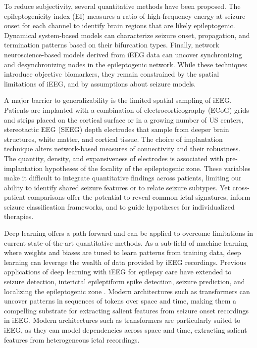 \documentclass[11pt]{article}
\begin{document}
To reduce subjectivity, several quantitative methods have been proposed. The epileptogenicity index (EI)\cite{Bartolomei2008Epileptogenicity, Grinenko2018fingerprint} measures a ratio of high-frequency energy at seizure onset for each channel to identify brain regions that are likely epileptogenic. Dynamical system-based models can characterize seizure onset, propagation, and termination patterns based on their bifurcation types\cite{Saggio2020taxonomy}. Finally, network neuroscience-based models derived from iEEG data can uncover synchronizing and desynchronizing nodes in the epileptogenic network\cite{Khambhati2016Virtual, Kini2019Virtual}. While these techniques introduce objective biomarkers, they remain constrained by the spatial limitations of iEEG, and by assumptions about seizure models.

A major barrier to generalizability is the limited spatial sampling of iEEG. Patients are implanted with a combination of electrocorticography (ECoG) grids and strips placed on the cortical surface or in a growing number of US centers, stereotactic EEG (SEEG) depth electrodes that sample from deeper brain structures, white matter, and cortical tissue. The choice of implantation technique alters network-based measures of connectivity and their robustness\cite{Bernabei2021Electrocorticography, Conrad2020sensitivity}. The quantity, density, and expansiveness of electrodes is associated with pre-implantation hypotheses of the focality of the epileptogenic zone\cite{Gallagher2023Quantifying,Astner2022Development}. These variables make it difficult to integrate quantitative findings across patients, limiting our ability to identify shared seizure features or to relate seizure subtypes. Yet cross-patient comparisons offer the potential to reveal common ictal signatures, inform seizure classification frameworks, and to guide hypotheses for individualized therapies.

Deep learning offers a path forward and can be applied to overcome limitations in current state-of-the-art quantitative methods. As a sub-field of machine learning where weights and biases are tuned to learn patterns from training data, deep learning can leverage the wealth of data provided by iEEG recordings. Previous applications of deep learning with iEEG for epilepsy care have extended to seizure detection\cite{Yuan2019Multi,Bhattacharya2023Unsupervised, Xu_2025}, interictal epileptiform spike detection\cite{Jing2020Development}, seizure prediction\cite{Nejedly2019Deep}, and localizing the epileptogenic zone \cite{Grattarola2022Seizure}. Modern architectures such as transformers can uncover patterns in sequences of tokens over space and time, making them a compelling substrate for extracting salient features from seizure onset recordings in iEEG. Modern architectures such as transformers are particularly suited to iEEG, as they can model dependencies across space and time, extracting salient features from heterogeneous ictal recordings.
\end{document}
